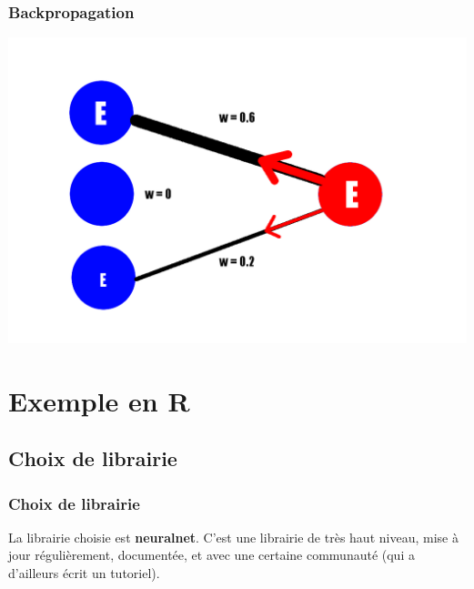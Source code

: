 \documentclass[compress]{beamer}
\begin{document}
			\begin{frame}
				\frametitle{Backpropagation}
				\vspace{-2em}
				\centerline{\includegraphics[width=0.8\linewidth]{img/bprop}}
			\end{frame}

			
	
	
	\section{Exemple en R}
		\subsection{Choix de librairie}
		\begin{frame}
			\frametitle{Choix de librairie}
			La librairie choisie est \textbf{neuralnet}. C'est une librairie de très haut niveau, mise à jour régulièrement, documentée, et avec une certaine communauté (qui a d'ailleurs écrit un tutoriel).
		\end{frame}
		
\end{document}
